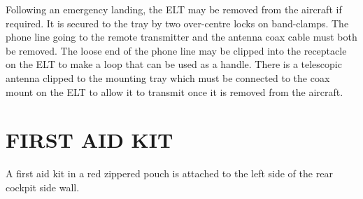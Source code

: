 Following an emergency landing, the ELT may be removed from the aircraft if required. It is secured to the tray by two over-centre locks on band-clamps. The phone line going to the remote transmitter and the antenna coax cable must both be removed. The loose end of the phone line may be clipped into the receptacle on the ELT to make a loop that can be used as a handle. There is a telescopic antenna clipped to the mounting tray which must be connected to the coax mount on the ELT to allow it to transmit once it is removed from the aircraft.

\section{FIRST AID KIT}
A first aid kit in a red zippered pouch is attached to the left side of the rear cockpit side wall.

\cleardoublepage 
